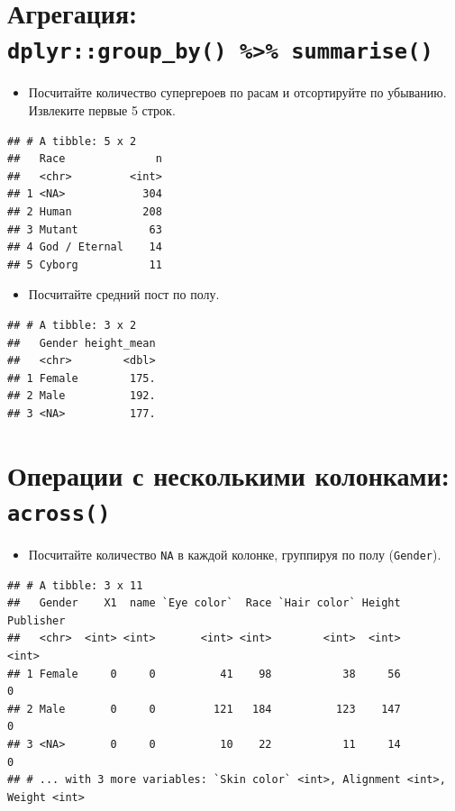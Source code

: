 \documentclass[]{book}
\providecommand{\tightlist}{%
  \setlength{\itemsep}{0pt}\setlength{\parskip}{0pt}}
\begin{document}
\section{\texorpdfstring{Агрегация:
\texttt{dplyr::group\_by()\ \%\textgreater{}\%\ summarise()}}{Агрегация: dplyr::group\_by() \%\textgreater{}\% summarise()}}\label{task_group_by}

\begin{itemize}
\tightlist
\item
  Посчитайте количество супергероев по расам и отсортируйте по убыванию.
  Извлеките первые 5 строк.
\end{itemize}

\begin{verbatim}
## # A tibble: 5 x 2
##   Race              n
##   <chr>         <int>
## 1 <NA>            304
## 2 Human           208
## 3 Mutant           63
## 4 God / Eternal    14
## 5 Cyborg           11
\end{verbatim}

\begin{itemize}
\tightlist
\item
  Посчитайте средний пост по полу.
\end{itemize}

\begin{verbatim}
## # A tibble: 3 x 2
##   Gender height_mean
##   <chr>        <dbl>
## 1 Female        175.
## 2 Male          192.
## 3 <NA>          177.
\end{verbatim}

\section{\texorpdfstring{Операции с несколькими колонками:
\texttt{across()}}{Операции с несколькими колонками: across()}}\label{task_across}

\begin{itemize}
\tightlist
\item
  Посчитайте количество \texttt{NA} в каждой колонке, группируя по полу
  (\texttt{Gender}).
\end{itemize}

\begin{verbatim}
## # A tibble: 3 x 11
##   Gender    X1  name `Eye color`  Race `Hair color` Height Publisher
##   <chr>  <int> <int>       <int> <int>        <int>  <int>     <int>
## 1 Female     0     0          41    98           38     56         0
## 2 Male       0     0         121   184          123    147         0
## 3 <NA>       0     0          10    22           11     14         0
## # ... with 3 more variables: `Skin color` <int>, Alignment <int>, Weight <int>
\end{verbatim}
\end{document}
